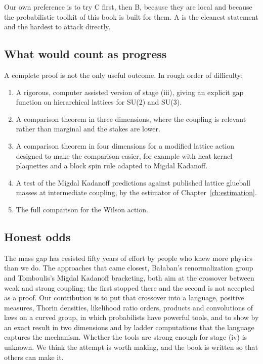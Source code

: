 Our own preference is to try C first, then B, because they are local and because the probabilistic toolkit of this book is built for them. A is the cleanest statement and the hardest to attack directly.

\subsection{What would count as progress}

A complete proof is not the only useful outcome. In rough order of difficulty:
\begin{enumerate}
\item A rigorous, computer assisted version of stage (iii), giving an explicit gap function on hierarchical lattices for SU(2) and SU(3).
\item A comparison theorem in three dimensions, where the coupling is relevant rather than marginal and the stakes are lower.
\item A comparison theorem in four dimensions for a modified lattice action designed to make the comparison easier, for example with heat kernel plaquettes and a block spin rule adapted to Migdal Kadanoff.
\item A test of the Migdal Kadanoff predictions against published lattice glueball masses at intermediate coupling, by the estimator of Chapter~\ref{ch:estimation}.
\item The full comparison for the Wilson action.
\end{enumerate}

\subsection{Honest odds}

The mass gap has resisted fifty years of effort by people who knew more physics than we do. The approaches that came closest, Ba\l aban's renormalization group and Tomboulis's Migdal Kadanoff bracketing, both aim at the crossover between weak and strong coupling; the first stopped there and the second is not accepted as a proof. Our contribution is to put that crossover into a language, positive measures, Thorin densities, likelihood ratio orders, products and convolutions of laws on a curved group, in which probabilists have powerful tools, and to show by an exact result in two dimensions and by ladder computations that the language captures the mechanism. Whether the tools are strong enough for stage (iv) is unknown. We think the attempt is worth making, and the book is written so that others can make it.

